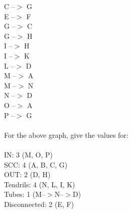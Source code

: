 \documentclass{article}
\begin{document}
		C --$>$ G\\
		E --$>$ F\\
		G --$>$ C\\
		G --$>$ H\\
		I --$>$ H\\
		I --$>$ K\\
		L --$>$ D\\
		M --$>$ A\\
		M --$>$ N\\
		N --$>$ D\\
		O --$>$ A\\
		P --$>$ G\\\\
		For the above graph, give the values for:\\\\
		IN: 3 (M, O, P)\\
		SCC: 4 (A, B, C, G)\\
		OUT: 2 (D, H)\\
		Tendrils: 4 (N, L, I, K)\\ 
		Tubes: 1 (M--$>$N--$>$D)\\
		Disconnected: 2 (E, F)\\
	
\end{document}
